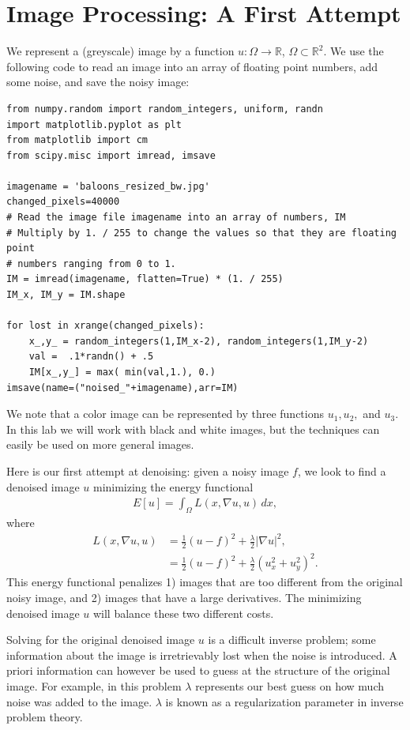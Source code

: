 \section*{Image Processing: A First Attempt}
We represent a (greyscale) image by a function $u:\Omega \to \mathbb{R}$, $\Omega \subset \mathbb{R}^2$. We use the following code to read an image into an array of floating point numbers, add some noise, and save the noisy image: 
\begin{lstlisting}
from numpy.random import random_integers, uniform, randn
import matplotlib.pyplot as plt
from matplotlib import cm
from scipy.misc import imread, imsave

imagename = 'baloons_resized_bw.jpg'
changed_pixels=40000
# Read the image file imagename into an array of numbers, IM
# Multiply by 1. / 255 to change the values so that they are floating point
# numbers ranging from 0 to 1.
IM = imread(imagename, flatten=True) * (1. / 255)
IM_x, IM_y = IM.shape
	
for lost in xrange(changed_pixels):
	x_,y_ = random_integers(1,IM_x-2), random_integers(1,IM_y-2)
	val =  .1*randn() + .5
	IM[x_,y_] = max( min(val,1.), 0.)
imsave(name=("noised_"+imagename),arr=IM)	
\end{lstlisting}
We note that a color image can be represented by three functions $u_1, u_2,$ and $u_3$. In this lab we will work with black and white images, but the techniques can easily be used on more general images. 


Here is our first attempt at denoising: given a noisy image $f$, we look to find a denoised image $u$ minimizing the energy functional 
\begin{align}
E[u] = \int_{\Omega} L(x,\nabla u, u) \, dx, \label{tv_images:diffusion}
\end{align}
where
\begin{align*}
L(x,\nabla u, u) &= \frac{1}{2}(u-f)^2 + \frac{\lambda}{2} | \nabla u|^2,\\
&= \frac{1}{2}(u-f)^2 + \frac{\lambda}{2} (u_x^2 + u_y^2)^2.
\end{align*}
This energy functional penalizes 1) images that are too different from the original noisy image, and 2) images that have a large derivatives. The minimizing denoised image $u$ will balance these two different costs. 

Solving for the original denoised image $u$ is a difficult inverse problem; some information about the image is irretrievably lost when the noise is introduced. A priori information can however be used to guess at the structure of the original image.  For example, in this problem $\lambda$ represents our best guess on how much noise was added to the image. $\lambda$ is known as a regularization parameter in inverse problem theory. 

